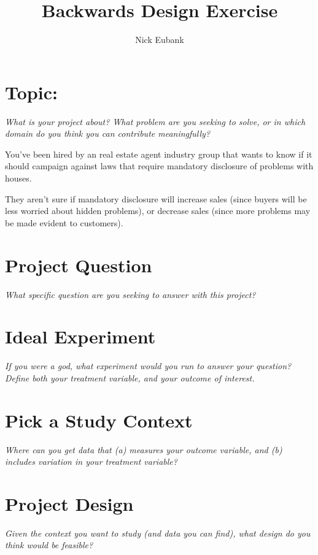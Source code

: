 \documentclass[12pt]{article}
\title{Backwards Design Exercise}
\author{Nick Eubank}
\begin{document}
\maketitle

\section{Topic:}
\emph{What is your project about? What problem are you seeking to solve, or in which domain do you think you can contribute meaningfully?}

You've been hired by an real estate agent industry group that wants to know if it should campaign against laws that require mandatory disclosure of problems with houses.

They aren't sure if mandatory disclosure will increase sales (since buyers will be less worried about hidden problems), or decrease sales (since more problems may be made evident to customers).

\section{Project Question}
\emph{What specific question are you seeking to answer with this project?}
\vspace*{1cm}\\

\section{Ideal Experiment}
\emph{If you were a god, what experiment would you run to answer your question? Define both your treatment variable, and your outcome of interest.}
\vspace*{1cm}\\

\section{Pick a Study Context}
\emph{Where can you get data that (a) measures your outcome variable, and (b) includes variation in your treatment variable?}
\vspace*{1cm}\\

\section{Project Design}
\emph{Given the context you want to study (and data you can find), what design do you think would be feasible?}
\vspace*{1cm}\\
\end{document}
